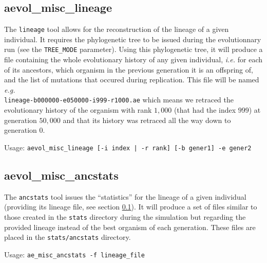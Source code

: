 \subsection{aevol\_misc\_lineage}
\label{sect:lineage}
The \verb?lineage? tool allows for the reconstruction of the lineage of a given individual. It requires the phylogenetic tree to be issued during the evolutionnary run (see the \verb?TREE_MODE? parameter). Using this phylogenetic tree, it will produce a file containing the whole evolutionary history of any given individual, \emph{i.e.} for each of its ancestors, which organism in the previous generation it is an offspring of, and the list of mutations that occured during replication. This file will be named \emph{e.g.} \\\verb?lineage-b000000-e050000-i999-r1000.ae? which means we retraced the evolutionary history of the organism with rank $1,000$ (that had the index $999$) at generation $50,000$ and that its history was retraced all the way down to generation $0$.

Usage: \verb?aevol_misc_lineage [-i index | -r rank] [-b gener1] -e gener2?

\subsection{aevol\_misc\_ancstats}
\label{sect:ancstats}
The \verb?ancstats? tool issues the ``statistics'' for the lineage of a given individual (providing its lineage file, see section \ref{sect:lineage}). It will produce a set of files similar to those created in the \verb?stats? directory during the simulation but regarding the provided lineage instead of the best organism of each generation. These files are placed in the \verb?stats/ancstats? directory.

Usage: \verb?ae_misc_ancstats -f lineage_file?


\clearemptydoublepage






